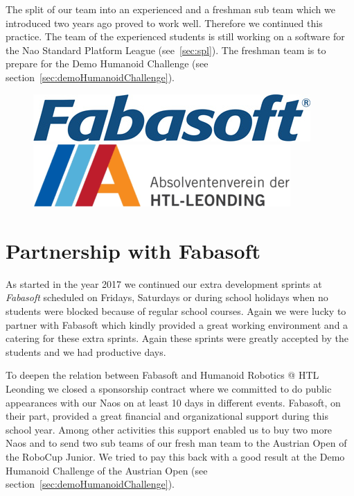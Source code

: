 \documentclass[11pt]{article}
\begin{document}
The split of our team into an experienced and a freshman sub team which we introduced two years ago proved to work well. Therefore we continued this practice. The team of the experienced students is still  working on a software for the Nao Standard Platform League (see~\ref{sec:spl}). The freshman team is to prepare for the Demo Humanoid Challenge (see section~\ref{sec:demoHumanoidChallenge}).

\begin{figure}[b]
\begin{center}
\includegraphics[scale=0.38]{img/fabasoft.png}
\hfill
\includegraphics[scale=0.38]{img/absleoLogo.png}
\end{center}
\end{figure}

\section{Partnership with Fabasoft}
As started in the year 2017 we continued our extra development sprints at {\em Fabasoft} scheduled on Fridays, Saturdays or during school holidays when no students were blocked because of regular school courses. Again we were lucky to partner with Fabasoft which kindly provided a great working environment and a catering for these extra sprints. Again these sprints were greatly accepted by the students and we had productive days.

To deepen the relation between Fabasoft and Humanoid Robotics @ HTL Leonding we closed a sponsorship contract where we committed to do public appearances with our Naos on at least 10 days in different events. Fabasoft, on their part, provided a great financial and organizational support during this school year. Among other activities this support enabled us to buy two more Naos and to send two sub teams of our fresh man team to the Austrian Open of the RoboCup Junior. We tried to pay this back with a good result at the Demo Humanoid Challenge of the Austrian Open (see section~\ref{sec:demoHumanoidChallenge}).
\end{document}

